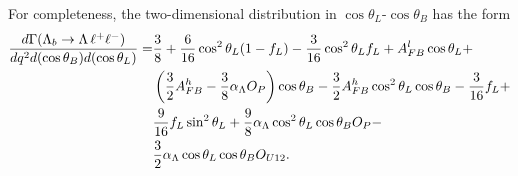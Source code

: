 %
%

For completeness, the two-dimensional distribution in $\cos\theta_L$-$\cos\theta_B$ has the form
\begin{align}
\frac{d\Gamma(\Lambda_{b}\rightarrow \Lambda \,\ell^{+}\ell^{-})}{dq^2d(\cos\theta_B) d(\cos\theta_L)}=&
\frac{3}{8}+\frac{6}{16}\cos^2\theta_L(1-f_L)-\frac{3}{16}\cos^2\theta_L f_L
+A_{FB}^l\cos\theta_L+ \nonumber \\
& \left(\frac{3}{2}A_{FB}^h-\frac{3}{8}\alpha_\Lambda O_P\right)\cos\theta_B
-\frac{3}{2}A_{FB}^h\cos^2\theta_L\cos\theta_B-\frac{3}{16}f_L+ \nonumber \\
& \frac{9}{16}f_L\sin^2\theta_L+\frac{9}{8}\alpha_\Lambda \cos^2\theta_L\cos\theta_B O_P- \nonumber \\
& \frac{3}{2}\alpha_\Lambda \cos\theta_L\cos\theta_B O_{U12}.
\label{eq:2DcosThetaLandB}
\end{align}


